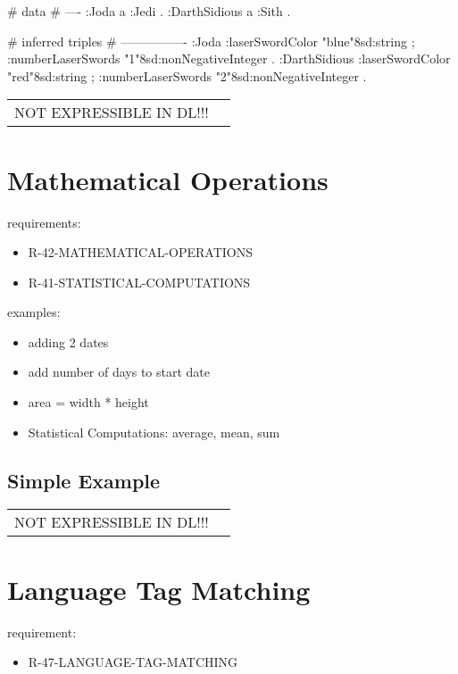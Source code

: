 \documentclass{llncs}
\newenvironment{DL}{
	\begin{center}
  \begin{tabular}{r l}

}{
  \end{tabular}
	\end{center}
}
\begin{document}
\begin{ex}
# data
# ----
:Joda a :Jedi .
:DarthSidious a :Sith .
\end{ex}

\begin{ex}
# inferred triples
# ----------------
:Joda 
    :laserSwordColor "blue"^^xsd:string ;
    :numberLaserSwords "1"^^xsd:nonNegativeInteger .
:DarthSidious 
    :laserSwordColor "red"^^xsd:string ;
    :numberLaserSwords "2"^^xsd:nonNegativeInteger .
\end{ex}

\begin{DL}
NOT EXPRESSIBLE IN DL!!!
\end{DL}

\section{Mathematical Operations}

requirements:

\begin{itemize}
	\item R-42-MATHEMATICAL-OPERATIONS
	\item R-41-STATISTICAL-COMPUTATIONS
\end{itemize}



examples:

\begin{itemize}
	\item adding 2 dates
	\item add number of days to start date
	\item area = width * height
	\item Statistical Computations: average, mean, sum
\end{itemize}

\subsection{Simple Example}

\begin{DL}
NOT EXPRESSIBLE IN DL!!!
\end{DL}

\section{Language Tag Matching}

requirement:

\begin{itemize}
	\item R-47-LANGUAGE-TAG-MATCHING
\end{itemize}
\end{document}

